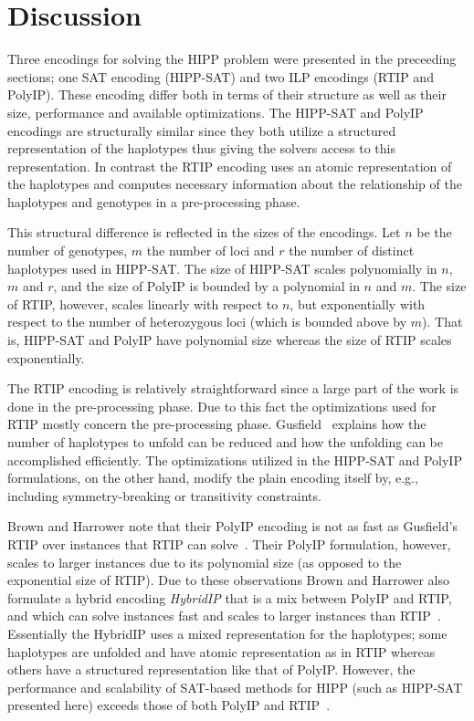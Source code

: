 \documentclass[12pt,a4paper]{article}
\begin{document}
\section{Discussion}

Three encodings for solving the HIPP problem were presented in the preceeding sections; one SAT encoding (HIPP-SAT) and two ILP encodings (RTIP and PolyIP).
These encoding differ both in terms of their structure as well as their size, performance and available optimizations.
The HIPP-SAT and PolyIP encodings are structurally similar since they both utilize a structured representation of the haplotypes thus giving the solvers access to this representation.
In contrast the RTIP encoding uses an atomic representation of the haplotypes and computes necessary information about the relationship of the haplotypes and genotypes in a pre-processing phase.

This structural difference is reflected in the sizes of the encodings.
Let $n$ be the number of genotypes, $m$ the number of loci and $r$ the number of distinct haplotypes used in HIPP-SAT.
The size of HIPP-SAT scales polynomially in $n$, $m$ and $r$, and the size of PolyIP is bounded by a polynomial in $n$ and $m$.
The size of RTIP, however, scales linearly with respect to $n$, but exponentially with respect to the number of heterozygous loci (which is bounded above by $m$).
That is, HIPP-SAT and PolyIP have polynomial size whereas the size of RTIP scales exponentially.

The RTIP encoding is relatively straightforward since a large part of the work is done in the pre-processing phase.
Due to this fact the optimizations used for RTIP mostly concern the pre-processing phase.
Gusfield~\cite{DBLP:conf/cpm/Gusfield03} explains how the number of haplotypes to unfold can be reduced and how the unfolding can be accomplished efficiently.
The optimizations utilized in the HIPP-SAT and PolyIP formulations, on the other hand, modify the plain encoding itself by, e.g., including symmetry-breaking or transitivity constraints.

Brown and Harrower note that their PolyIP encoding is not as fast as Gusfield's RTIP over instances that RTIP can solve~\cite{DBLP:journals/tcbb/BrownH06}.
Their PolyIP formulation, however, scales to larger instances due to its polynomial size (as opposed to the exponential size of RTIP).
Due to these observations Brown and Harrower also formulate a hybrid encoding \emph{HybridIP} that is a mix between PolyIP and RTIP, and which can solve instances fast and scales to larger instances than RTIP~\cite{DBLP:conf/cpm/Gusfield03}.
Essentially the HybridIP uses a mixed representation for the haplotypes; 
some haplotypes are unfolded and have atomic representation as in RTIP whereas others have a structured representation like that of PolyIP.
However, the performance and scalability of SAT-based methods for HIPP (such as HIPP-SAT presented here) exceeds those of both PolyIP and RTIP~\cite{DBLP:journals/jcb/GracaLMO10}.
\end{document}

